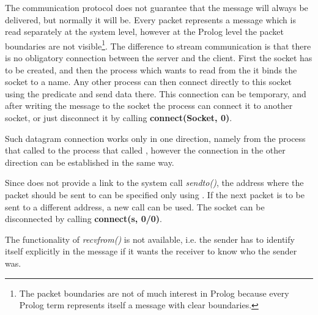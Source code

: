 The communication protocol does not guarantee that the message
will always be delivered, but normally it will be.
Every packet represents a message which is read separately
at the system level, however at the Prolog level the packet
boundaries are not visible\footnote{The packet boundaries are not of much
interest in Prolog because every Prolog term represents itself
a message with clear boundaries.}.
The difference to stream communication is that
there is no obligatory connection between the server and the client.
First the socket has to be created, and then the process which wants
to read from the it binds the socket to a name.
Any other process can then connect directly to this socket
using the  predicate and send data there.
This connection can be temporary, and after writing the message
to the socket the process can connect it to another socket,
or just disconnect it by calling {\bf connect(Socket, 0)}.

Such datagram connection works only in one direction, namely
from the process that called  to the process that called
, however the connection in the other direction
can be established in the same way.

Since {\eclipse} does not provide a link to the system call {\it sendto()},
the address where the packet should be sent
to can be specified only using .
If the next packet is to be sent to a different address, a new 
call can be used.
The socket can be disconnected by calling {\bf connect(s, 0/0)}.

The functionality of {\it recvfrom()} is not available, i.e.
the sender has to identify itself explicitly in the message
if it wants the receiver to know who the sender was.

